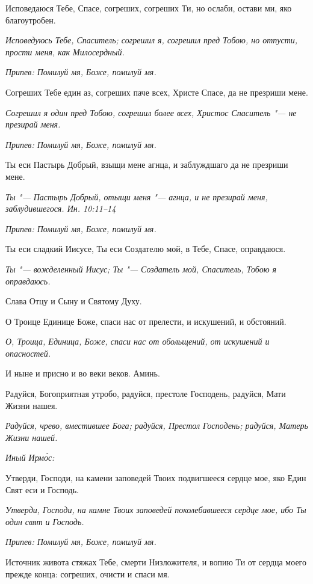 Исповедаюся Тебе, Спасе, согреших, согреших Ти, но ослаби, остави ми, яко благоутробен.


\itshape Исповедуюсь Тебе, Спаситель; согрешил я, согрешил пред Тобою, но отпусти, прости меня, как Милосердный.\normalfont{}


\itshape Припев:\normalfont{} Помилуй мя, Боже, помилуй мя.


Согреших Тебе един аз, согреших паче всех, Христе Спасе, да не презриши мене.


\itshape Согрешил я один пред Тобою, согрешил более всех, Христос Спаситель "--- не презирай меня.\normalfont{}


\itshape Припев:\normalfont{} Помилуй мя, Боже, помилуй мя.


Ты еси Пастырь Добрый, взыщи мене агнца, и заблуждшаго да не презриши мене.


\itshape Ты "--- Пастырь Добрый, отыщи меня "--- агнца, и не презирай меня, заблудившегося. Ин. 10:11–14\normalfont{}


\itshape Припев:\normalfont{} Помилуй мя, Боже, помилуй мя.


Ты еси сладкий Иисусе, Ты еси Создателю мой, в Тебе, Спасе, оправдаюся.


\itshape Ты "--- вожделенный Иисус; Ты "--- Создатель мой, Спаситель, Тобою я оправдаюсь.\normalfont{}


Слава Отцу и Сыну и Святому Духу.


О Троице Единице Боже, спаси нас от прелести, и искушений, и обстояний.


\itshape О, Троица, Единица, Боже, спаси нас от обольщений, от искушений и опасностей.\normalfont{}


И ныне и присно и во веки веков. Аминь.


Радуйся, Богоприятная утробо, радуйся, престоле Господень, радуйся, Мати Жизни нашея.


\itshape Радуйся, чрево, вместившее Бога; радуйся, Престол Господень; радуйся, Матерь Жизни нашей.\normalfont{}


\itshape Иный Ирмо́с:\normalfont{}


Утверди, Господи, на камени заповедей Твоих подвигшееся сердце мое, яко Един Свят еси и Господь.


\itshape Утверди, Господи, на камне Твоих заповедей поколебавшееся сердце мое, ибо Ты один свят и Господь.\normalfont{}


\itshape Припев:\normalfont{} Помилуй мя, Боже, помилуй мя.


Источник живота стяжах Тебе, смерти Низложителя, и вопию Ти от сердца моего прежде конца: согреших, очисти и спаси мя.


